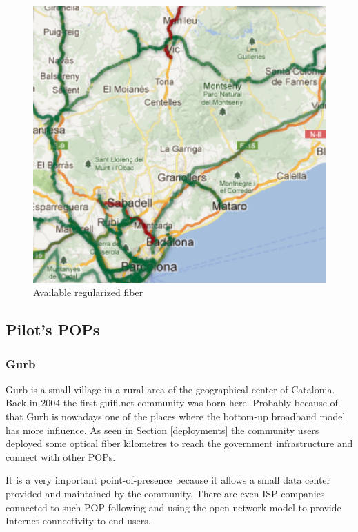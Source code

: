 \begin{figure}[htbp]
  \centering
  \includegraphics[scale=.5]{sect3/figures/xoc_map.eps} 
  \caption{Available regularized fiber}
  \label{fig:xoc_map}
\end{figure}



\subsection{Pilot's POPs}

\subsubsection{Gurb}

Gurb is a small village in a rural area of the geographical center of Catalonia. Back in 2004 the first guifi.net community
was born here. Probably because of that Gurb is nowadays one of the places where the bottom-up broadband model has more
influence. As seen in Section \ref{deployments} the community users deployed some optical fiber kilometres to reach the government
infrastructure and connect with other POPs.


It is a very important point-of-presence because it allows a small data center provided and maintained by the community.
There are even ISP companies connected to such POP following and using the open-network model to provide Internet
connectivity to end users.


